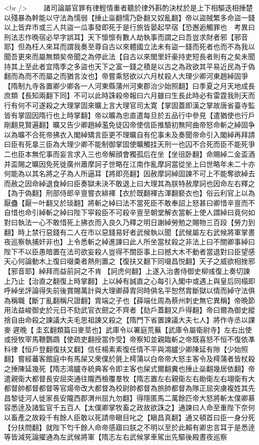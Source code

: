 <br />
　　諸司論屬官罪有律輕情重者聽於律外斟酌決杖於是上下相驅迭相捶楚以殘暴為幹能以守法為懦弱【捶止橤翻懦乃卧翻又奴亂翻】帝以盜賊繁多命盜一錢以上皆弃市或三人共盜一瓜事發即死于是行旅皆晏起早宿【恐邂逅觸罪也　考異曰刑法志作晩宿必早字誤耳】天下懔懔有數人劫執事而謂之曰吾豈求財者邪【邪音耶】但為枉人來耳而謂我奏至尊自古以來體國立法未有盜一錢而死者也而不為我以聞吾更來而屬無類矣帝聞之為停此法【自古以來閭里奸豪持吏短長者則有之矣未聞持其上至此者宜隋季之多盜也天下之富一錢之積是以古之為政欲其平易近民為于偽翻而為而不而屬之而猶言汝也】帝嘗乘怒欲以六月杖殺人大理少卿河東趙綽固爭【隋制九寺各置卿少卿各一人河東縣蒲州河東郡治少始照翻】曰季夏之月天地成長庶類【長知兩翻下同】不可以此時誅殺帝報曰六月雖曰生長此時必有雷霆我則天而行有何不可遂殺之大理掌固來曠上言大理官司太寛【掌固蓋即漢之掌故唐省臺寺監皆有掌固因隋行也上時掌翻】帝以曠為忠直遣每旦於五品行中參見【遣猶使也行戶剛翻見賢遍翻】曠又告少卿趙綽濫免徒囚帝使信臣推驗初無阿曲帝怒命斬之綽固争以為曠不合死帝拂衣入閣綽矯言臣更不理曠自有佗事未及奏聞帝命引入閣綽再拜請曰臣有死辠三臣為大理少卿不能制御掌固使曠觸挂天刑一也囚不合死而臣不能死爭二也臣本無佗事而妄言求入三也帝解顔會獨孤后在坐【坐徂卧翻】命賜綽二金盃酒并盃賜之曠因免死徙廣州蕭摩訶子世略在江南作亂摩訶當從坐上曰世略年未二十亦何能為以其名將之子為人所逼耳【將即亮翻】因赦摩訶綽固諫不可上不能奪欲綽去而赦之因命綽退食綽曰臣奏獄未決不敢退上曰大理其為朕特赦摩訶也因命左右釋之【為于偽翻】刑部侍郎辛亶嘗衣緋褌【衣於既翻褌古渾翻褻衣也】俗云利官上以為厭蠱【厭一叶翻又於琰翻】將斬之綽曰法不當死臣不敢奉詔上怒甚曰卿惜辛亶而不自惜也命引綽斬之綽曰陛下寜殺臣不可殺辛亶至朝堂解衣當斬上使人謂綽曰竟何如對曰執法一心不敢惜死上拂衣而入良久乃釋之明日謝綽勞勉之賜物三百段【勞力到翻】時上禁行惡錢有二人在市以惡錢易好者武候執以聞【武候屬左右武候將軍掌晝夜巡察執捕奸非也】上令悉斬之綽進諫曰此人所坐當杖殺之非法上曰不關卿事綽曰陛下不以臣愚暗置在法司欲妄殺人豈得不關臣事上曰撼大木不動者當退對曰臣望感天心何論動木上復曰啜羮者熱則置之【復扶又翻下同啜昌悦翻】天子之威欲相挫邪【邪音耶】綽拜而益前訶之不肯【訶虎何翻】上遂入治書侍御史柳彧復上奏切諫上乃止【治直之翻復上時掌翻】上以綽有誠直之心每引入閣中或遇上與皇后同榻即呼綽坐評論得失前後賞賜萬計與大理卿薛胄同時俱名平恕然胄斷獄以情而綽守法俱為稱職【斷丁亂翻稱尺證翻】胄端之子也【薛端仕周為蔡州刺史無它異稱】帝晩節用法益峻御史於元日不劾武官衣劒之不齊者【劾戶蓋翻又戶得翻】帝曰爾為御史縱捨自由命殺之諫議大夫毛思祖諫又殺之【隋門下省置諫議大夫七人】將作寺丞以課麥遲晚【圭玄翻類篇曰麥莖也】武庫令以署庭荒蕪【武庫令屬衛尉寺】左右出使或授牧宰馬鞭鸚鵡【使疏吏翻授當作受】帝察知並親臨斬之帝既喜怒不恒不復依凖科律【恒戶登翻復扶又翻】信任楊素素復任情不平與鴻臚少卿陳延有隙【少始照翻】嘗經蕃客館庭中有馬屎又衆僕於氈上樗蒲以白帝帝大怒主客令及樗蒲者皆杖殺之捶陳延幾死【隋志鴻臚寺統典客令即主客也屎式爾翻糞也捶止橤翻幾居依翻】帝遣親衛大都督長安屈突通往隴西檢覆羣牧【隋志置左右親衛左右勛衛左右翊衛有大都督帥都督都督等官煬帝改大都督為校尉帥都督為旅帥都督為隊正屈突虜複姓其先昌黎徒河人徙家長安隴西郡渭州屈九勿翻】得隱匿馬二萬餘匹帝大怒將斬太僕卿慕容悉逹及諸監官千五百人【太僕卿掌牧畜之政故欲誅之】通諫曰人命至重陛下奈何以畜產之故殺千有餘人臣敢以死請帝瞋目叱之【瞋昌真翻】通又頓首曰臣一身分死【分扶問翻】就陛下匄千餘人命帝感寤曰朕之不明以至於此賴有卿忠言耳于是悉逹等皆減死論擢通為左武候將軍【隋志左右武候掌車駕出先驅後殿晝夜巡察
